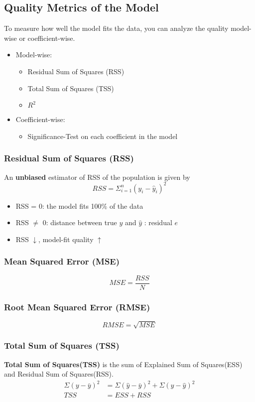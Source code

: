 \subsection{Quality Metrics of the Model}
To measure how well the model fits the data, you can analyze the quality model-wise or coefficient-wise.
\begin{itemize}
	\item Model-wise: 
	\begin{itemize}
		\item Residual Sum of Squares (RSS)
		\item Total Sum of Squares (TSS)
		\item $R^2$
	\end{itemize}
	\item Coefficient-wise:
	\begin{itemize}
		\item Significance-Test on each coefficient in the model
	\end{itemize}
\end{itemize}
\subsubsection{Residual Sum of Squares (RSS)}
An \textbf{unbiased} estimator of RSS of the population is given by 
$$RSS = \Sigma_{i=1}^{n} (y_i - \hat{y}_i)^2$$
\begin{itemize}
	\item RSS = 0: the model fits 100\% of the data
	\item RSS $\neq$ 0: distance between true $y$ and $\hat{y}$ : residual $e$
	\item RSS $\downarrow$, model-fit quality $\uparrow$
\end{itemize}
\subsubsection{Mean Squared Error (MSE)}
$$MSE = \frac{RSS}{N}$$
\subsubsection{Root Mean Squared Error (RMSE)}
$$RMSE = \sqrt{MSE}$$
\subsubsection{Total Sum of Squares (TSS)}
\textbf{Total Sum of Squares(TSS)} is the sum of Explained Sum of Squares(ESS) and Residual Sum of Squares(RSS).
\begin{align*}
	\Sigma (y - \bar{y})^2 &= \Sigma (\hat{y} - \bar{y})^2 + \Sigma (y - \hat{y})^2 \\
	TSS &= ESS + RSS
\end{align*}
